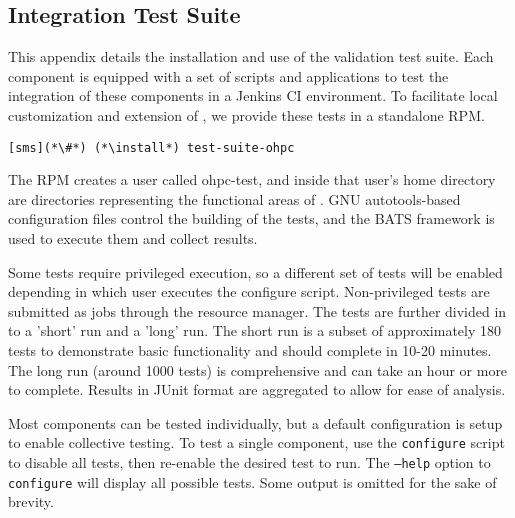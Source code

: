 \subsection{Integration Test Suite}  \label{appendix:test_suite}

This appendix details the installation and use of the \OHPC validation test
suite. Each \OHPC component is equipped with a set of scripts and applications
to test the integration of these components in a Jenkins CI 
environment. To facilitate local customization and extension of \OHPC, we 
provide these tests in a standalone RPM. 

\begin{lstlisting}
[sms](*\#*) (*\install*) test-suite-ohpc
\end{lstlisting}

The RPM creates a user called ohpc-test, and inside that user's home directory 
are directories representing the functional areas of \OHPC. GNU 
autotools-based configuration files control the building of the tests, and the
BATS framework is used to execute them and collect results. 

Some tests require privileged execution, so a different set of tests will be
enabled depending in which user executes the configure script. Non-privileged
tests are submitted as jobs through the \rms{} resource manager. The tests are
further divided in to a 'short' run and a 'long' run. The short run is a subset
of approximately 180 tests to demonstrate basic functionality and should 
complete in 10-20 minutes. The long run (around 1000 tests) is comprehensive 
and can take an hour or more to complete.  Results in JUnit format are 
aggregated to allow for ease of analysis.

Most components can be tested individually, but a default configuration is setup 
to enable collective testing. To test a single component, use the \texttt{configure}
script to disable all tests, then re-enable the desired test to run. The
\texttt{--help} option to \texttt{configure} will display all possible tests. Some 
output is omitted for the sake of brevity.

